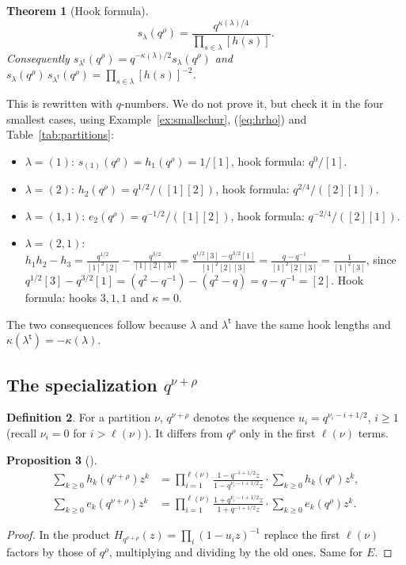 \documentclass[11pt]{article}
\theoremstyle{plain}
\newtheorem{theorem}{Theorem}[section]
\newtheorem{proposition}[theorem]{Proposition}
\theoremstyle{definition}
\newtheorem{definition}[theorem]{Definition}
\theoremstyle{remark}
\newcommand{\qrho}{q^{\rho}}
\newcommand{\qlr}[1]{q^{#1+\rho}}
\newcommand{\tr}{{\mathsf t}}
\newcommand{\lt}[1]{#1^{\tr}}
\begin{document}
\begin{theorem}[Hook formula]\label{thm:hook}
\begin{equation}\label{eq:hook}
s_\lambda(\qrho)=\frac{q^{\kappa(\lambda)/4}}{\prod_{s\in\lambda}[h(s)]} .
\end{equation}
Consequently $s_{\lt\lambda}(\qrho)=q^{-\kappa(\lambda)/2}s_\lambda(\qrho)$ and
$s_\lambda(\qrho)\,s_{\lt\lambda}(\qrho)=\prod_{s\in\lambda}[h(s)]^{-2}$.
\end{theorem}

This is \cite[I.3, Ex.~2]{Macdonald} rewritten with $q$-numbers. We do not prove it, but check
it in the four smallest cases, using Example~\ref{ex:smallschur}, (\ref{eq:hrho}) and
Table~\ref{tab:partitions}:
\begin{itemize}
\item $\lambda=(1)$: $s_{(1)}(\qrho)=h_1(\qrho)=1/[1]$, hook formula: $q^0/[1]$. \checkmark
\item $\lambda=(2)$: $h_2(\qrho)=q^{1/2}/([1][2])$, hook formula: $q^{2/4}/([2][1])$. \checkmark
\item $\lambda=(1,1)$: $e_2(\qrho)=q^{-1/2}/([1][2])$, hook formula: $q^{-2/4}/([2][1])$. \checkmark
\item $\lambda=(2,1)$: $h_1h_2-h_3=\frac{q^{1/2}}{[1]^2[2]}-\frac{q^{3/2}}{[1][2][3]}
=\frac{q^{1/2}[3]-q^{3/2}[1]}{[1]^2[2][3]}=\frac{q-q^{-1}}{[1]^2[2][3]}=\frac{1}{[1]^2[3]}$,
since $q^{1/2}[3]-q^{3/2}[1]=(q^2-q^{-1})-(q^2-q)=q-q^{-1}=[2]$. Hook formula: hooks $3,1,1$
and $\kappa=0$. \checkmark
\end{itemize}
The two consequences follow because $\lambda$ and $\lt\lambda$ have the same hook lengths and
$\kappa(\lt\lambda)=-\kappa(\lambda)$.

\subsection{The specialization \texorpdfstring{$q^{\nu+\rho}$}{q\textasciicircum(nu+rho)}}

\begin{definition}
For a partition $\nu$, $\qlr{\nu}$ denotes the sequence $u_i=q^{\nu_i-i+1/2}$, $i\ge1$ (recall
$\nu_i=0$ for $i>\ell(\nu)$). It differs from $\qrho$ only in the first $\ell(\nu)$ terms.
\end{definition}

\begin{proposition}[{\cite[(3)]{Kon}}]\label{prop:hnu}
\begin{align}
\sum_{k\ge0}h_k(\qlr\nu)z^k&=\prod_{i=1}^{\ell(\nu)}\frac{1-q^{-i+1/2}z}{1-q^{\nu_i-i+1/2}z}
\cdot\sum_{k\ge0}h_k(\qrho)z^k,\label{eq:hnu}\\
\sum_{k\ge0}e_k(\qlr\nu)z^k&=\prod_{i=1}^{\ell(\nu)}\frac{1+q^{\nu_i-i+1/2}z}{1+q^{-i+1/2}z}
\cdot\sum_{k\ge0}e_k(\qrho)z^k.\label{eq:enu}
\end{align}
\end{proposition}
\begin{proof}
In the product $H_{\qlr\nu}(z)=\prod_i(1-u_iz)^{-1}$ replace the first $\ell(\nu)$ factors by
those of $\qrho$, multiplying and dividing by the old ones. Same for $E$.
\end{proof}
\end{document}
